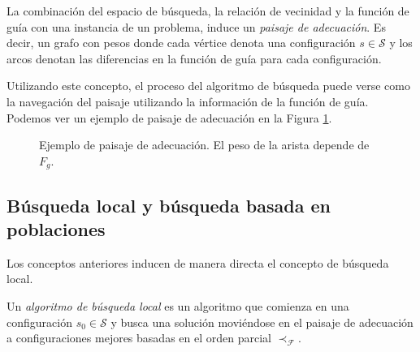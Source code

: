 \begin{definition}
    La combinación del espacio de búsqueda, la relación de vecinidad y la función de guía con una instancia de un problema, induce un \textit{paisaje de adecuación}. Es decir, un grafo con pesos donde cada vértice denota una configuración $s\in\mathcal{S}$ y los arcos denotan las diferencias en la función de guía para cada configuración.
\end{definition}
Utilizando este concepto, el proceso del algoritmo de búsqueda puede verse como la navegación del paisaje utilizando la información de la función de guía. Podemos ver un ejemplo de paisaje de adecuación en la Figura \ref{fig:fit-lands}.
\begin{figure}[ht]
    \hspace{5.5cm}
    \caption{Ejemplo de paisaje de adecuación. El peso de la arista depende de $F_g$.}
    \label{fig:fit-lands}
\end{figure}

\subsection{Búsqueda local y búsqueda basada en poblaciones}
Los conceptos anteriores inducen de manera directa el concepto de búsqueda local.

\begin{definition}
    Un \textit{algoritmo de búsqueda local} es un algoritmo que comienza en una configuración $s_0\in\mathcal{S}$ y busca una solución moviéndose en el paisaje de adecuación a configuraciones mejores basadas en el orden parcial $\prec_\mathscr{F}$.
\end{definition}

